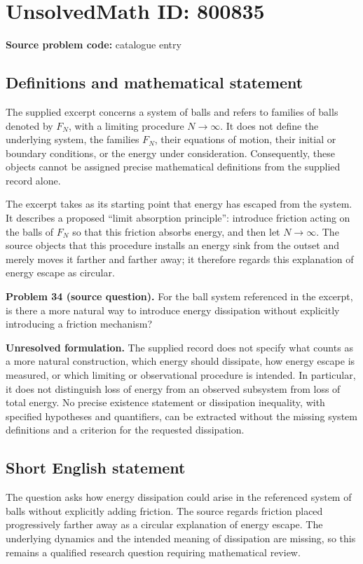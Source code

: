 \documentclass[11pt]{article}
\begin{document}
\section*{UnsolvedMath ID: 800835}
\textbf{Source problem code:} catalogue entry
\subsection{Definitions and mathematical statement}
The supplied excerpt concerns a system of balls and refers to families of balls denoted by $F_N$, with a limiting procedure $N\to\infty$. It does not define the underlying system, the families $F_N$, their equations of motion, their initial or boundary conditions, or the energy under consideration. Consequently, these objects cannot be assigned precise mathematical definitions from the supplied record alone.

The excerpt takes as its starting point that energy has escaped from the system. It describes a proposed ``limit absorption principle'': introduce friction acting on the balls of $F_N$ so that this friction absorbs energy, and then let $N\to\infty$. The source objects that this procedure installs an energy sink from the outset and merely moves it farther and farther away; it therefore regards this explanation of energy escape as circular.

\textbf{Problem 34 (source question).} For the ball system referenced in the excerpt, is there a more natural way to introduce energy dissipation without explicitly introducing a friction mechanism?

\textbf{Unresolved formulation.} The supplied record does not specify what counts as a more natural construction, which energy should dissipate, how energy escape is measured, or which limiting or observational procedure is intended. In particular, it does not distinguish loss of energy from an observed subsystem from loss of total energy. No precise existence statement or dissipation inequality, with specified hypotheses and quantifiers, can be extracted without the missing system definitions and a criterion for the requested dissipation.
\subsection{Short English statement}
The question asks how energy dissipation could arise in the referenced system of balls without explicitly adding friction. The source regards friction placed progressively farther away as a circular explanation of energy escape. The underlying dynamics and the intended meaning of dissipation are missing, so this remains a qualified research question requiring mathematical review.
\end{document}
